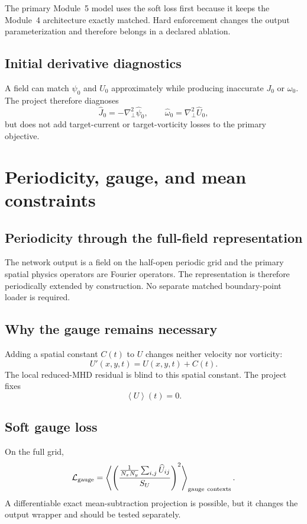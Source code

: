 \documentclass[11pt]{article}
\newcommand{\average}[1]{\left\langle #1\right\rangle}
\newcommand{\Lap}{\nabla_\perp^2}
\newcommand{\Lgauge}{\mathcal{L}_{\mathrm{gauge}}}
\begin{document}
The primary Module~5 model uses the soft loss first because it keeps the Module~4 architecture exactly matched. Hard enforcement changes the output parameterization and therefore belongs in a declared ablation.

\subsection{Initial derivative diagnostics}
A field can match $\psi_0$ and $U_0$ approximately while producing inaccurate $J_0$ or $\omega_0$. The project therefore diagnoses
\begin{equation}
\widehat J_0=-\Lap\widehat\psi_0,
\qquad
\widehat\omega_0=\Lap\widehat U_0,
\end{equation}
but does not add target-current or target-vorticity losses to the primary objective.

\section{Periodicity, gauge, and mean constraints}
\label{sec:gauge}

\subsection{Periodicity through the full-field representation}
The network output is a field on the half-open periodic grid and the primary spatial physics operators are Fourier operators. The representation is therefore periodically extended by construction. No separate matched boundary-point loader is required.

\subsection{Why the gauge remains necessary}
Adding a spatial constant $C(t)$ to $U$ changes neither velocity nor vorticity:
\begin{equation}
U'(x,y,t)=U(x,y,t)+C(t).
\end{equation}
The local reduced-MHD residual is blind to this spatial constant. The project fixes
\begin{equation}
\average U(t)=0.
\end{equation}

\subsection{Soft gauge loss}
On the full grid,
\begin{equation}
\Lgauge=
\average{
\left(
\frac{\frac{1}{N_xN_y}\sum_{i,j}\widehat U_{ij}}{S_U}
\right)^2
}_{\rm gauge\ contexts}.
\label{eq:gauge_loss}
\end{equation}
A differentiable exact mean-subtraction projection is possible, but it changes the output wrapper and should be tested separately.
\end{document}
